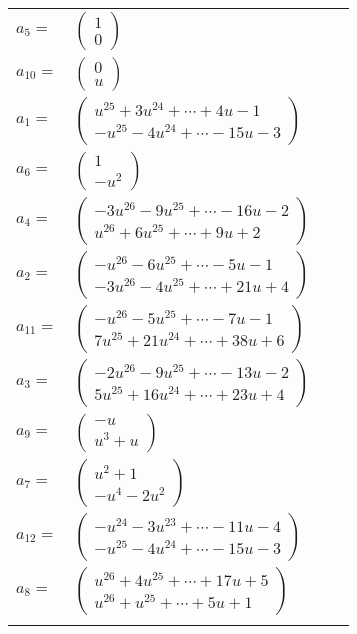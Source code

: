 \documentclass[1p]{elsarticle_modified}
\theoremstyle{definition}
\begin{document}
\begin{tabular}{m{7pt} m{180pt} m{7pt} m{180pt} }
\flushright $a_{5}=$&$\begin{pmatrix}1\\0\end{pmatrix}$ \\
\flushright $a_{10}=$&$\begin{pmatrix}0\\u\end{pmatrix}$ \\
\flushright $a_{1}=$&$\begin{pmatrix}u^{25}+3 u^{24}+\cdots+4 u-1\\- u^{25}-4 u^{24}+\cdots-15 u-3\end{pmatrix}$ \\
\flushright $a_{6}=$&$\begin{pmatrix}1\\- u^2\end{pmatrix}$ \\
\flushright $a_{4}=$&$\begin{pmatrix}-3 u^{26}-9 u^{25}+\cdots-16 u-2\\u^{26}+6 u^{25}+\cdots+9 u+2\end{pmatrix}$ \\
\flushright $a_{2}=$&$\begin{pmatrix}- u^{26}-6 u^{25}+\cdots-5 u-1\\-3 u^{26}-4 u^{25}+\cdots+21 u+4\end{pmatrix}$ \\
\flushright $a_{11}=$&$\begin{pmatrix}- u^{26}-5 u^{25}+\cdots-7 u-1\\7 u^{25}+21 u^{24}+\cdots+38 u+6\end{pmatrix}$ \\
\flushright $a_{3}=$&$\begin{pmatrix}-2 u^{26}-9 u^{25}+\cdots-13 u-2\\5 u^{25}+16 u^{24}+\cdots+23 u+4\end{pmatrix}$ \\
\flushright $a_{9}=$&$\begin{pmatrix}- u\\u^3+u\end{pmatrix}$ \\
\flushright $a_{7}=$&$\begin{pmatrix}u^2+1\\- u^4-2 u^2\end{pmatrix}$ \\
\flushright $a_{12}=$&$\begin{pmatrix}- u^{24}-3 u^{23}+\cdots-11 u-4\\- u^{25}-4 u^{24}+\cdots-15 u-3\end{pmatrix}$ \\
\flushright $a_{8}=$&$\begin{pmatrix}u^{26}+4 u^{25}+\cdots+17 u+5\\u^{26}+u^{25}+\cdots+5 u+1\end{pmatrix}$\\&\end{tabular}
\end{document}
